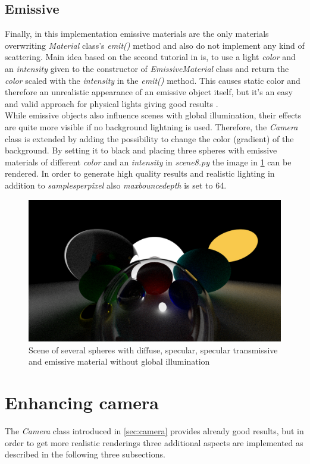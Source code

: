 \documentclass[]{article}
\begin{document}
		\subsection{Emissive}
		Finally, in this implementation emissive materials are the only materials overwriting \emph{Material} class's \emph{emit()} method and also do not implement any kind of scattering. Main idea based on the second tutorial in \cite{Shirley2020RTW2} is, to use a light \emph{color} and an \emph{intensity} given to the constructor of \emph{EmissiveMaterial} class and return the \emph{color} scaled with the \emph{intensity} in the \emph{emit()} method. This causes static color and therefore an unrealistic appearance of an emissive object itself, but it's an easy and valid approach for physical lights giving good results .
		\\
		While emissive objects also influence scenes with global illumination, their effects are quite more visible if no background lightning is used. Therefore, the \emph{Camera} class is extended by adding the possibility to change the color (gradient) of the background. By setting it to black and placing three spheres with emissive materials of different \emph{color} and an \emph{intensity} in \emph{scene8.py} the image in \cref{fig:image8} can be rendered. In order to generate high quality results and realistic lighting in addition to \emph{samples\textunderscore per\textunderscore pixel} also \emph{max\textunderscore bounce\textunderscore depth} is set to 64.
		
		\begin{figure}[h]
			\centering
			\includegraphics[width=0.9\linewidth]{image8}
			\caption{Scene of several spheres with diffuse, specular, specular transmissive and emissive material without global illumination}
			\label{fig:image8}
		\end{figure}
		
	\section{Enhancing camera}
		The \emph{Camera} class introduced in \cref{sec:camera} provides already good results, but in order to get more realistic renderings three additional aspects are implemented as described in the following three subsections.
		
\end{document}
